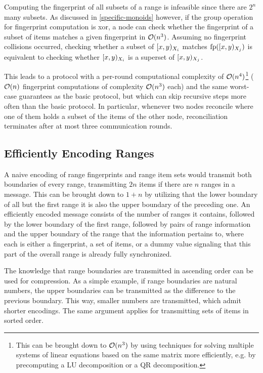 Computing the fingerprint of all subsets of a range is infeasible since there are $2^n$ many subsets. As discussed in \cref{specific-monoids} however, if the group operation for fingerprint computation is xor, a node can check whether the fingerprint of a subset of items matches a given fingerprint in $\mathcal{O}(n^3)$.
Assuming no fingerprint collisions occurred, checking whether a subset of $[{x},{y})_{X_i}$ matches $\operatorname{fp}([{x},{y})_{X_j})$ is equivalent to checking whether $[{x},{y})_{X_i}$ is a superset of $[{x},{y})_{X_j}$.

This leads to a protocol with a per-round computational complexity of $\mathcal{O}(n^4)$\footnote{This can be brought down to $\mathcal{O}(n^3)$ by using techniques for solving multiple systems of linear equations based on the same matrix more efficiently, e.g. by precomputing a LU decomposition or a QR decomposition.} ($\mathcal{O}(n)$ fingerprint computations of complexity $\mathcal{O}(n^3)$ each) and the same worst-case guarantees as the basic protocol, but which can skip recursive steps more often than the basic protocol. In particular, whenever two nodes reconcile where one of them holds a subset of the items of the other node, reconciliation terminates after at most three communication rounds.

\subsection{Efficiently Encoding Ranges}

A naive encoding of range fingerprints and range item sets would transmit both boundaries of every range, transmitting $2n$ items if there are $n$ ranges in a message. This can be brought down to $1 + n$ by utilizing that the lower boundary of all but the first range it is also the upper boundary of the preceding one. An efficiently encoded message consists of the number of ranges it contains, followed by the lower boundary of the first range, followed by pairs of range information and the upper boundary of the range that the information pertains to, where each  is either a fingerprint, a set of items, or a dummy value signaling that this part of the overall range is already fully synchronized.

The knowledge that range boundaries are transmitted in ascending order can be used for compression. As a simple example, if range boundaries are natural numbers, the upper boundaries can be transmitted as the difference to the previous boundary. This way, smaller numbers are transmitted, which admit shorter encodings. The same argument applies for transmitting sets of items in sorted order.

